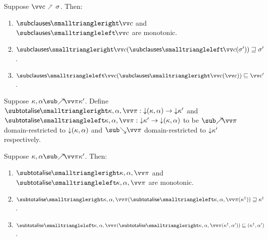 \begin{lemma}
  \label{lem:aux:clauses:gc}
  Suppose $\vec{c} \clauseFwdR \sigma$. Then:
  \begin{enumerate}
     \item $\desugarClausesFwdF{\vec{c}}$ and $\desugarClausesBwdF{\vec{c}}$ are monotonic.
     \item $\desugarClausesFwdF{\vec{c}}(\desugarClausesBwdF{\vec{c}}(\sigma')) \geq \sigma'$.
     \item $\desugarClausesBwdF{\vec{c}}(\desugarClausesFwdF{\vec{c}}(\vec{c})) \leq \vec{c}'$.
  \end{enumerate}
\end{lemma}

\begin{definition}
   Suppose $\totaliseFwd{\kappa}{\alpha}{\vec{\pi}}{\kappa'}$. Define $\totaliseFwdF{\kappa,\alpha,\vec{\pi}}: \Below{(\kappa,\alpha)} \to \Below{\kappa'}$ and $\totaliseBwdF{\kappa,\alpha,\vec{\pi}}: \Below{\kappa'} \to \Below{(\kappa,\alpha)}$ to be $\totaliseFwdR{\vec{\pi}}$ domain-restricted to ${\downarrow}{(\kappa,\alpha)}$ and $\totaliseBwdR{\vec{\pi}}$ domain-restricted to ${\downarrow}{\kappa'}$ respectively.
\end{definition}

\begin{lemma}
  \label{lem:aux:list-gen:gc}
  \item
  Suppose $\totaliseFwd{\kappa}{\alpha}{\vec{\pi}}{\kappa'}$. Then:
  \begin{enumerate}
     \item $\totaliseFwdF{\kappa,\alpha,\vec{\pi}}$ and $\totaliseBwdF{\kappa,\alpha,\vec{\pi}}$ are monotonic.
     \item $\totaliseFwdF{\kappa,\alpha,\vec{\pi}}(\totaliseBwdF{\kappa,\alpha,\vec{\pi}}(\smash{\kappa^\dagger})) \geq \smash{\kappa^\dagger}$.
     \item $\totaliseBwdF{\kappa,\alpha,\vec{\pi}}(\totaliseFwdF{\kappa,\alpha,\vec{\pi}}(\smash{\kappa^\dagger}, \alpha')) \leq (\smash{\kappa^\dagger}, \alpha')$.
  \end{enumerate}
\end{lemma}
